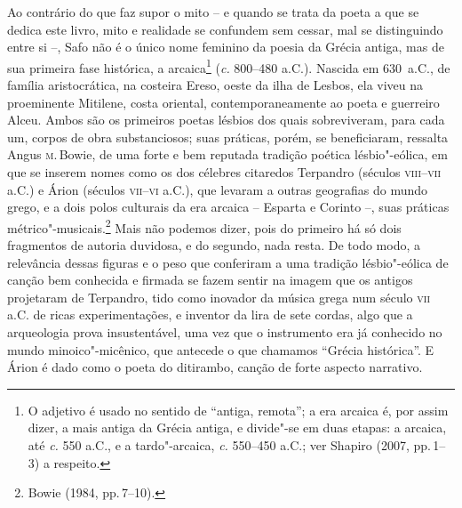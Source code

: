 \noindent{}Ao contrário do que faz supor o mito -- e quando se trata da poeta a que se
dedica este livro, mito e realidade se confundem sem cessar, mal se
distinguindo entre si --, Safo não é o único nome feminino da poesia da Grécia
	antiga, mas de sua primeira fase histórica, a arcaica\footnote{ O adjetivo é
	usado no sentido de “antiga, remota”; a era arcaica é, por assim dizer, a mais
	antiga da Grécia antiga, e divide"-se em duas etapas: a arcaica, até \textit{c.}
	550 a.C., e a tardo"-arcaica, \textit{c.} 550--450 a.C.; ver Shapiro (2007, pp.\,1--3) a respeito.} (\textit{c.} 800--480 a.C.). Nascida em 630~a.C., de família
aristocrática, na costeira Ereso, oeste da ilha de Lesbos, ela viveu na
proeminente Mitilene, costa oriental, contemporaneamente ao poeta e guerreiro
Alceu. Ambos são os primeiros poetas lésbios dos quais sobreviveram, para cada
um, corpos de obra substanciosos; suas práticas, porém, se beneficiaram,
ressalta Angus \textsc{m}.\,Bowie, de uma forte e bem reputada tradição
poética lésbio"-eólica, em que se inserem nomes como os dos célebres citaredos
Terpandro (séculos \textsc{viii}--\textsc{vii} a.C.) e Árion (séculos
\textsc{vii}--\textsc{vi} a.C.), que levaram a
outras geografias do mundo grego, e a dois polos culturais da era arcaica --
	Esparta e Corinto --, suas práticas métrico"-musicais.\footnote{ Bowie (1984,
	pp.\,7--10).} Mais não podemos dizer,
pois do primeiro há só dois fragmentos de autoria duvidosa, e do segundo, nada
resta. De todo modo, a relevância dessas figuras e o peso que conferiram a uma
tradição lésbio"-eólica de canção bem conhecida e firmada se
fazem sentir na imagem que os antigos projetaram de Terpandro, tido como
inovador da música grega num século \textsc{vii} a.C. de ricas experimentações, e
inventor da lira de sete cordas, algo que a arqueologia prova insustentável,
uma vez que o instrumento era já conhecido no mundo minoico"-micênico, que
antecede o que chamamos “Grécia histórica”. E Árion é dado como o
poeta do ditirambo, canção de forte aspecto narrativo.

